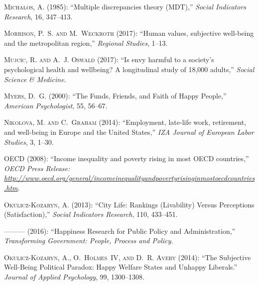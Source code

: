 \documentclass[10pt, letterpaper]{article}
\begin{document}
\begin{spacing}{1.4}
\begin{thebibliography}{91}
\textsc{Michalos, A.} (1985): \enquote{Multiple discrepancies theory (MDT),}
  \emph{Social Indicators Research}, 16, 347--413.

\textsc{Morrison, P.~S. and M.~Weckroth} (2017): \enquote{Human values,
  subjective well-being and the metropolitan region,} \emph{Regional Studies},
  1--13.

\textsc{Mujcic, R. and A.~J. Oswald} (2017): \enquote{Is envy harmful to a
  society's psychological health and wellbeing? A longitudinal study of 18,000
  adults,} \emph{Social Science \& Medicine}.

\textsc{Myers, D.~G.} (2000): \enquote{The Funds, Friends, and Faith of Happy
  People,} \emph{American Psychologist}, 55, 56--67.

\textsc{Nikolova, M. and C.~Graham} (2014): \enquote{Employment, late-life
  work, retirement, and well-being in Europe and the United States,} \emph{IZA
  Journal of European Labor Studies}, 3, 1--30.

\textsc{OECD} (2008): \enquote{Income inequality and poverty rising in most
  OECD countries,} \emph{OECD Press Release:
  \url{http://www.oecd.org/general/incomeinequalityandpovertyrisinginmostoecdcountries.htm}}.

\textsc{Okulicz-Kozaryn, A.} (2013): \enquote{City Life: Rankings (Livability)
  Versus Perceptions (Satisfaction),} \emph{Social Indicators Research}, 110,
  433--451.

---\hspace{-.1pt}---\hspace{-.1pt}--- (2016): \enquote{Happiness Research for
  Public Policy and Administration,} \emph{Transforming Government: People,
  Process and Policy}.

\textsc{Okulicz-Kozaryn, A., O.~Holmes~IV, and D.~R. Avery} (2014):
  \enquote{The Subjective Well-Being Political Paradox: Happy Welfare States
  and Unhappy Liberals.} \emph{Journal of Applied Psychology}, 99, 1300--1308.


\end{thebibliography}
\end{spacing}
\end{document}

